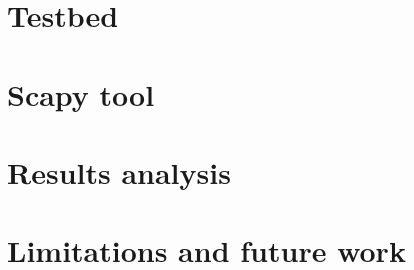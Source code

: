\section{Testbed}
\section{Scapy tool}
\section{Results analysis}
\section{Limitations and future work}


